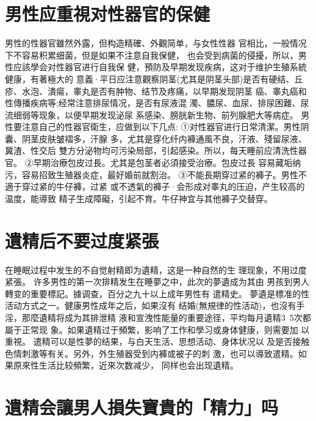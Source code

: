 \documentclass[12pt,UTF8]{ctexbook}
\begin{document}
\section{男性应重視对性器官的保健}

男性的性器官雖然外露，但构造精確、外觀简单，与女性性器
官相比，一般情况下不容易积累细菌，但是如果不注意自我保健，
也会受到病菌的侵擾，所以，男性应該學会对性器官进行自我保
健，預防及早期发现疾病，这对于维护生殖系統健康，有著極大的
意義·平日应注意觀察阴茎(尤其是阴茎头部)是否有硬结、丘
疹、水泡、潰瘍，睾丸是否有肿物、结节及疼痛，以早期发现阴茎
癌、睾丸癌和性傳播疾病等;经常注意排尿情况，是否有尿液混
濁、膿尿、血尿、排尿困難、尿流细弱等现象，以便早期发现泌尿
系感染、膀胱新生物、前列腺肥大等病症。
男性要注意自己的性器官衛生，应做到以下几点:
①对性器官进行日常清潔。男性阴囊、阴茎皮肤皱褶多，汗腺
多，尤其是穿化纤内褲通風不良，汗液、殘留尿液、冀渣、性交后
雙方分泌物均可污染局部，引起感染。所以，每天睡前应清洗性器
官。
②早期治療包皮过長。尤其是包茎者必須接受治療。包皮过長
容易藏垢纳污，容易招致生殖器炎症，最好婚前就割治。
③不能長期穿过紧的褲子。男性不適于穿过紧的牛仔褲，过紧
或不透氣的褲子·会形成对睾丸的压迫，产生较高的温度，能導致
精子生成障礙，引起不育。牛仔神宜与其他褲子交替穿。

\section{遺精后不要过度紧張}

在睡眠过程中发生的不自觉射精即为遺精，这是一种自然的生
理现象，不用过度紧張。
许多男性的第一次排精发生在睡夢之中，此次的夢遺成为其由
男孩到男人轉变的重要標記。據调查，百分之九十以上成年男性有
遣精史。
夢遺是標准的性活动方式之一。健康男性成年之后，如果沒有
结婚(無規律的性活动)，也沒有手淫，那麼遺精将成为其排泄精
液和宣洩性能量的重要途径，平均每月遺精3~5次都屬于正常现
象。如果遺精过于頻繁，影响了工作和學习或身体健康，则需要加
以重視。
遣精可以是性夢的结果，与白天生活、思想活动、身体状况以
及是否接触色情刺激等有关。另外，外生殖器受到内褲或被子的刺
激，也可以導致遣精。如果原來性生活比较頻繁，近來次数减少，
同样也会出现遺精。

\section{遺精会讓男人損失寶貴的「精力」吗}
\end{document}
